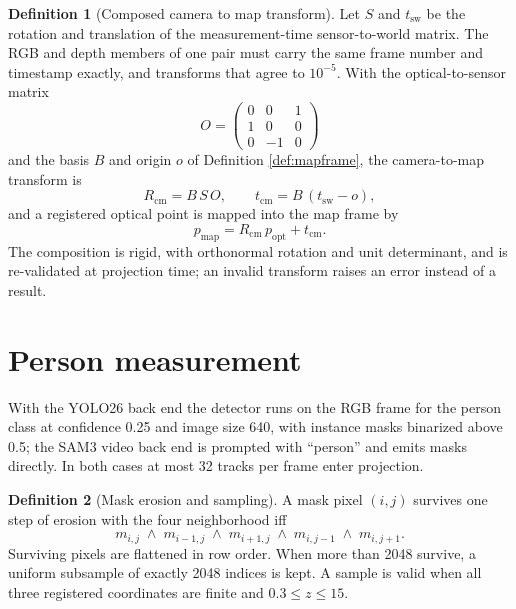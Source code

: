 \documentclass[10pt,a4paper]{article}
\theoremstyle{plain}
\theoremstyle{definition}
\newtheorem{definition}{Definition}[section]
\theoremstyle{remark}
\begin{document}
\begin{definition}[Composed camera to map transform]\label{def:cam2map}
Let $S$ and $t_{\mathrm{sw}}$ be the rotation and translation of the measurement-time sensor-to-world matrix. The RGB and depth members of one pair must carry the same frame number and timestamp exactly, and transforms that agree to $10^{-5}$. With the optical-to-sensor matrix
\begin{equation}
O = \begin{pmatrix} 0 & 0 & 1 \\ 1 & 0 & 0 \\ 0 & -1 & 0 \end{pmatrix}
\end{equation}
and the basis $B$ and origin $o$ of Definition \ref{def:mapframe}, the camera-to-map transform is
\begin{equation}
R_{\mathrm{cm}} = B\,S\,O, \qquad t_{\mathrm{cm}} = B\,(t_{\mathrm{sw}} - o),
\end{equation}
and a registered optical point is mapped into the map frame by
\begin{equation}
p_{\mathrm{map}} = R_{\mathrm{cm}}\,p_{\mathrm{opt}} + t_{\mathrm{cm}} .
\end{equation}
The composition is rigid, with orthonormal rotation and unit determinant, and is re-validated at projection time; an invalid transform raises an error instead of a result.
\end{definition}

\section{Person measurement}

With the YOLO26 back end the detector runs on the RGB frame for the person class at confidence 0.25 and image size 640, with instance masks binarized above 0.5; the SAM3 video back end is prompted with ``person'' and emits masks directly. In both cases at most 32 tracks per frame enter projection.

\begin{definition}[Mask erosion and sampling]\label{def:erosion}
A mask pixel $(i,j)$ survives one step of erosion with the four neighborhood iff
\begin{equation}
m_{i,j} \;\land\; m_{i-1,j} \;\land\; m_{i+1,j} \;\land\; m_{i,j-1} \;\land\; m_{i,j+1} .
\end{equation}
Surviving pixels are flattened in row order. When more than 2048 survive, a uniform subsample of exactly 2048 indices is kept. A sample is valid when all three registered coordinates are finite and $0.3 \le z \le 15$.
\end{definition}
\end{document}

